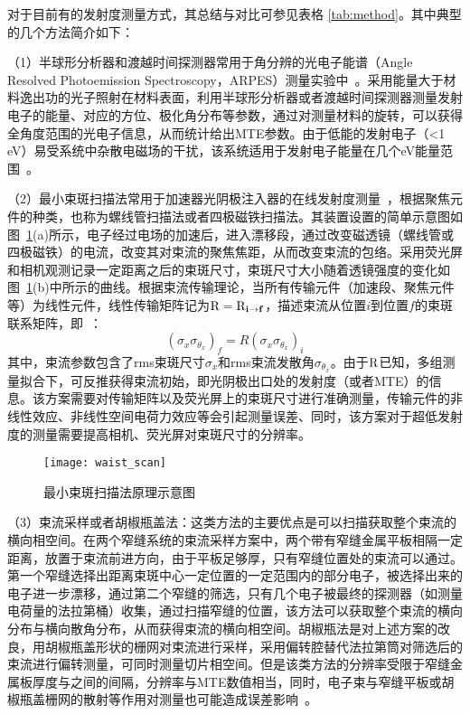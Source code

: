 对于目前有的发射度测量方式，其总结与对比可参见表格 \ref{tab:method}\cite{lee2015review}。其中典型的几个方法简介如下：

（1）半球形分析器\cite{Palczewski:2010aa}和渡越时间探测器\cite{Wang:2012aa, Sertore:2004aa}常用于角分辨的光电子能谱（Angle Resolved Photoemission Spectroscopy，ARPES）测量实验中~\cite{Palczewski:2010aa,Zhang:2011aa}。采用能量大于材料逸出功的光子照射在材料表面，利用半球形分析器或者渡越时间探测器测量发射电子的能量、对应的方位、极化角分布等参数，通过对测量材料的旋转，可以获得全角度范围的光电子信息，从而统计给出MTE参数。由于低能的发射电子（<1\,eV）易受系统中杂散电磁场的干扰，该系统适用于发射电子能量在几个eV能量范围~\cite{Droubay:2014aa,Sertore:2004aa}。

（2）最小束斑扫描法常用于加速器光阴极注入器的在线发射度测量~\cite{engelen2014effective,bazarov2008thermal,bazarov2011thermal,anderson2002space,hauri2010intrinsic}，根据聚焦元件的种类，也称为螺线管扫描法或者四极磁铁扫描法。其装置设置的简单示意图如图~\ref{fig:waist_scan}(a)所示，电子经过电场的加速后，进入漂移段，通过改变磁透镜（螺线管或四极磁铁）的电流，改变其对束流的聚焦焦距，从而改变束流的包络。采用荧光屏和相机观测记录一定距离之后的束斑尺寸，束斑尺寸大小随着透镜强度的变化如图~\ref{fig:waist_scan}(b)中所示的曲线。根据束流传输理论，当所有传输元件（加速段、聚焦元件等）为线性元件，线性传输矩阵记为$\bf{\text{R}}=\bf{\text{R}}_{i\to f}$，描述束流从位置$i$到位置$f$的束斑联系矩阵，即~\cite{bazarov2008thermal}：
\begin{equation}
\label{eq:waist_scan}
\left(\sigma_x \sigma_{\theta_x}\right)_f = R\left(\sigma_x \sigma_{\theta_x}\right)_i
\end{equation}
其中，束流参数包含了rms束斑尺寸$\sigma_x$和rms束流发散角$\sigma_{\theta_x}$。由于$\bf{\text{R}}$已知，多组测量拟合下，可反推获得束流初始，即光阴极出口处的发射度（或者MTE）的信息。该方案需要对传输矩阵以及荧光屏上的束斑尺寸进行准确测量，传输元件的非线性效应、非线性空间电荷力效应等会引起测量误差、同时，该方案对于超低发射度的测量需要提高相机、荧光屏对束斑尺寸的分辨率。
\begin{figure}[htbp]
\centering
\texttt{[image: waist\_scan]}
\caption{\label{fig:waist_scan} 最小束斑扫描法原理示意图}
\end{figure}

（3）束流采样或者胡椒瓶盖法\cite{anderson2002space,gulliford2013demonstration,li2012nanometer}：这类方法的主要优点是可以扫描获取整个束流的横向相空间。在两个窄缝系统的束流采样方案中，两个带有窄缝金属平板相隔一定距离，放置于束流前进方向，由于平板足够厚，只有窄缝位置处的束流可以通过。第一个窄缝选择出距离束斑中心一定位置的一定范围内的部分电子，被选择出来的电子进一步漂移，通过第二个窄缝的筛选，只有几个电子被最终的探测器（如测量电荷量的法拉第桶）收集，通过扫描窄缝的位置，该方法可以获取整个束流的横向分布与横向散角分布，从而获得束流的横向相空间。胡椒瓶法是对上述方案的改良，用胡椒瓶盖形状的栅网对束流进行采样，采用偏转腔替代法拉第筒对筛选后的束流进行偏转测量，可同时测量切片相空间。但是该类方法的分辨率受限于窄缝金属板厚度与之间的间隔，分辨率与MTE数值相当，同时，电子束与窄缝平板或胡椒瓶盖栅网的散射等作用对测量也可能造成误差影响~\cite{Reiser:2008aa,Maxson:2015aa}。

